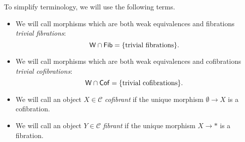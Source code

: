\documentclass[main.tex]{subfiles}
\begin{document}
To simplify terminology, we will use the following terms.
\begin{itemize}
  \item We will call morphisms which are both weak equivalences and fibrations \emph{trivial fibrations}:
    \begin{equation*}
      \mathsf{W} \cap \mathsf{Fib} = \{\text{trivial fibrations}\}.
    \end{equation*}

  \item We will call morphisms which are both weak equivalences and cofibrations \emph{trivial cofibrations}:
    \begin{equation*}
      \mathsf{W} \cap \mathsf{Cof} = \{\text{trivial cofibrations}\}.
    \end{equation*}

  \item We will call an object $X \in \mathcal{C}$ \emph{cofibrant} if the unique morphism $\emptyset \to X$ is a cofibration.

  \item We will call an object $Y \in \mathcal{C}$ \emph{fibrant} if the unique morphism $X \to *$ is a fibration.
\end{itemize}
\end{document}
